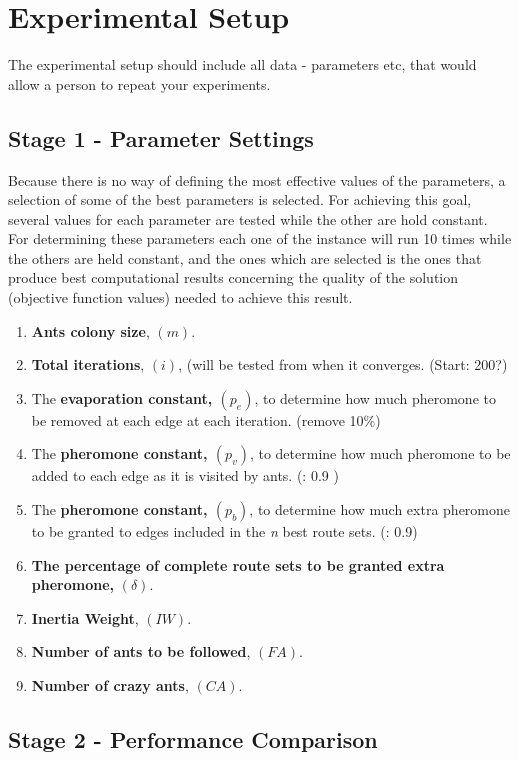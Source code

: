 \section{Experimental Setup}

The experimental setup should include all data - parameters etc, that would allow a person to repeat your experiments. 
 
\subsection{Stage 1 - Parameter Settings}
\label{subsec:parameterSettings_setup}

Because there is no way of defining the most effective values of the parameters, a selection of some of the best parameters is selected. For achieving this goal, several values for each parameter are tested while the other are hold constant. For determining these parameters each one of the instance will run 10 times while the others are held constant, and the ones which are selected is the ones that produce best computational results concerning the quality of the solution (objective function values) needed to achieve this result. 

\begin{enumerate}
\item \textbf{Ants colony size}, $(m)$.
\item \textbf{Total iterations}, $(i)$, (will be tested from when it converges. (Start: 200?)
\item The \textbf{evaporation constant, $(p_{e})$}, to determine how much pheromone to be removed at each edge at each iteration. (remove 10\%)
\item The \textbf{pheromone constant, $(p_{v})$}, to determine how much pheromone to be added to each edge as it is visited by ants. (: 0.9 )
\item The \textbf{pheromone constant, $(p_{b})$}, to determine how much extra pheromone to be granted to edges included in the \textit{n} best route sets. (: 0.9)
\item \textbf{The percentage of complete route sets to be granted extra pheromone,} $(\delta)$.
\item \textbf{Inertia Weight}, $(IW)$.
\item \textbf{Number of ants to be followed}, $(FA)$.
\item \textbf{Number of crazy ants}, $(CA)$.
\end{enumerate}

\subsection{Stage 2 - Performance Comparison}

